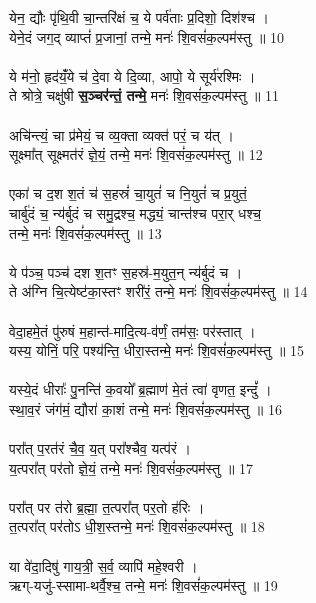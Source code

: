 येन॒ द्यौः पृ॑थि॒वी चा॒न्तरि॑क्षं च॒ ये पर्व॑ताः प्र॒दिशो॒ दिश॑श्च ।\\
येने॒दं जग॒द् व्याप्तं॑ प्र॒जानां॒ तन्मे॒ मनः॑ शि॒वसं॑क॒ल्पम॑स्तु ॥ 10\\
\\
ये म॑नो॒ हृद॑यंँ॒ये च॑ दे॒वा ये दि॒व्या, आपो॒ ये सूर्य॑रश्मिः ।\\
ते श्रोत्रे॒ चक्षु॑षी \textbf{स॒ञ्चर॑न्तं॒ तन्मे॒} मनः॑ शि॒वसं॑क॒ल्पम॑स्तु ॥ 11\\
\\
अचि॑न्त्यं॒ चा प्र॑मेयं॒ च व्य॒क्ता व्यक्त॑ परं॒ च य॑त् ।\\
सूक्ष्मा᳚त् सूक्ष्मत॑रं ज्ञे॒यं॒ तन्मे॒ मनः॑ शि॒वसं॑क॒ल्पम॑स्तु ॥ 12\\
\\
एका॑ च द॒श श॒तं च॑ स॒हस्रं॑ चा॒युतं॑ च नि॒युतं॑ च प्र॒युतं॒\\
चार्बु॑दं च॒ न्य॑र्बुदं च समु॒द्रश्च॒ मद्ध्यं॒ चान्त॑श्च परा॒र् धश्च॒\\
तन्मे॒ मनः॑ शि॒वसं॑क॒ल्पम॑स्तु ॥ 13\\
\\
ये प॑ञ्च॒ पञ्च॑ दश श॒तꣳ स॒हस्र॑-म॒युत॒न् न्य॑र्बुदं च ।\\
ते अ॑ग्नि चि॒त्येष्ट॑का॒स्तꣳ शरी॑रं॒ तन्मे॒ मनः॑ शि॒वसं॑क॒ल्पम॑स्तु ॥ 14\\
\\
वेदा॒हमे॒तं पु॑रुषं म॒हान्त॑-मादि॒त्य-व॑र्णं॒ तम॑सः॒ पर॑स्तात् ।\\
यस्य॒ योनिं॒ परि॒ पश्य॑न्ति॒ धीरा॒स्तन्मे॒ मनः॑ शि॒वसं॑क॒ल्पम॑स्तु ॥ 15\\
\\
यस्ये॒दं धीराः᳚ पु॒नन्ति॑ क॒वयो᳚ ब्र॒ह्माण॑ मे॒तं त्वा॑ वृणत॒ इन्दुं᳚ ।\\
स्था॒व॒रं जंग॑मं॒ द्यौरा॑ का॒शं तन्मे॒ मनः॑ शि॒वसं॑क॒ल्पम॑स्तु ॥ 16\\
\\
परा᳚त् प॒रत॑रं चै॒व॒ य॒त् परा᳚श्चैव॒ यत्प॑रं ।\\
य॒त्परा᳚त् पर॑तो ज्ञे॒यं॒ तन्मे॒ मनः॑ शि॒वसं॑क॒ल्पम॑स्तु ॥ 17\\
\\
परा᳚त् पर त॑रो ब्र॒ह्मा॒ त॒त्परा᳚त् पर॒तो ह॑रिः ।\\
त॒त्परा᳚त् पर॑तोऽ धी॒श॒स्तन्मे॒ मनः॑ शि॒वसं॑क॒ल्पम॑स्तु ॥ 18\\
\\
या वे॑दा॒दिषु॑ गाय॒त्री॒ स॒र्व॒ व्यापि॑ महे॒श्वरी ।\\
ऋग्-यजु॑-स्सामा-थर्वै॒श्च॒ तन्मे॒ मनः॑ शि॒वसं॑क॒ल्पम॑स्तु ॥ 19\\
\\
